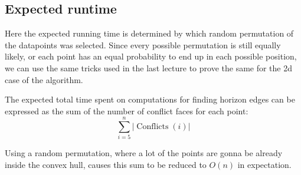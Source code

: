 \documentclass{article}
\begin{document}
  \subsection{Expected runtime}
  Here the expected running time is determined by which random permutation of the datapoints was selected.
  Since every possible permutation is still equally likely,
  or each point has an equal probability to end up in each possible position,
  we can use the same tricks used in the last lecture to prove the same for the 2d case of the algorithm.

  The expected total time spent on computations for finding horizon edges can be expressed
  as the sum of the number of conflict faces for each point:
  \[ \sum_{i=5}^{n} |\operatorname{Conflicts}(i)| \]

  Using a random permutation, where a lot of the points are gonna be already inside the convex hull,
  causes this sum to be reduced to $O(n)$ in expectation.

\end{document}
